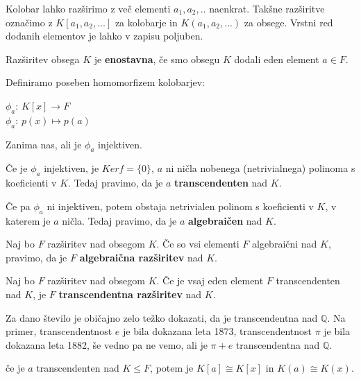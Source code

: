 \documentclass[11pt, a4paper]{article}
\begin{document}
    Kolobar lahko razširimo z več elementi \(a_1,a_2,..\) naenkrat. Takšne razširitve označimo z \(K[a_1,a_2,...]\) za kolobarje in \(K(a_1,a_2,...)\) za obsege. Vrstni red dodanih elementov je lahko v zapisu poljuben.

    \begin{definition}
        Razširitev obsega \(K\) je \textbf{enostavna}, če smo obsegu \(K\) dodali eden element \(a \in F\).
    \end{definition}

    Definiramo poseben homomorfizem kolobarjev:
    \begin{center}
        \(\phi_a\): \(K[x] \to F\) \\
        \(\phi_a\): \(p(x) \mapsto p(a)\)
    \end{center}

    Zanima nas, ali je \(\phi_a\) injektiven.
    \par
    Če je \(\phi_a\) injektiven, je \(Ker f = \{0\}\), \(a\) ni ničla nobenega (netrivialnega) polinoma s koeficienti v \(K\). Tedaj pravimo, da je \(a\) \textbf{transcendenten} nad \(K\).
    \par
    Če pa \(\phi_a\) ni injektiven, potem obstaja netrivialen polinom s koeficienti v \(K\), v katerem je \(a\) ničla. Tedaj pravimo, da je \(a\) \textbf{algebraičen} nad \(K\).
    
    \begin{definition}
        Naj bo \(F\) razširitev nad obsegom \(K\). Če so vsi elementi \(F\) algebraični nad \(K\), pravimo, da je \(F\) \textbf{algebraična razširitev} nad \(K\).
    \end{definition}

    \begin{definition}
        Naj bo \(F\) razširitev nad obsegom \(K\). Če je vsaj eden element \(F\) transcendenten nad \(K\), je \(F\) \textbf{transcendentna razširitev} nad \(K\). 
    \end{definition}

    \begin{remark}
        Za dano število je običajno zelo težko dokazati, da je transcendentna nad \(\mathbb{Q}\). Na primer, transcendentnost \(e\) je bila dokazana leta 1873, transcendentnost \(\pi\) je bila dokazana leta 1882, še vedno pa ne vemo, ali je \(\pi + e\) transcendentna nad \(\mathbb{Q}\).
    \end{remark}

    \begin{theorem}
        če je \(a\) transcendenten nad \(K \le F\), potem je \(K[a] \cong K[x]\) in \(K(a) \cong K(x)\).
    \end{theorem}
\end{document}
